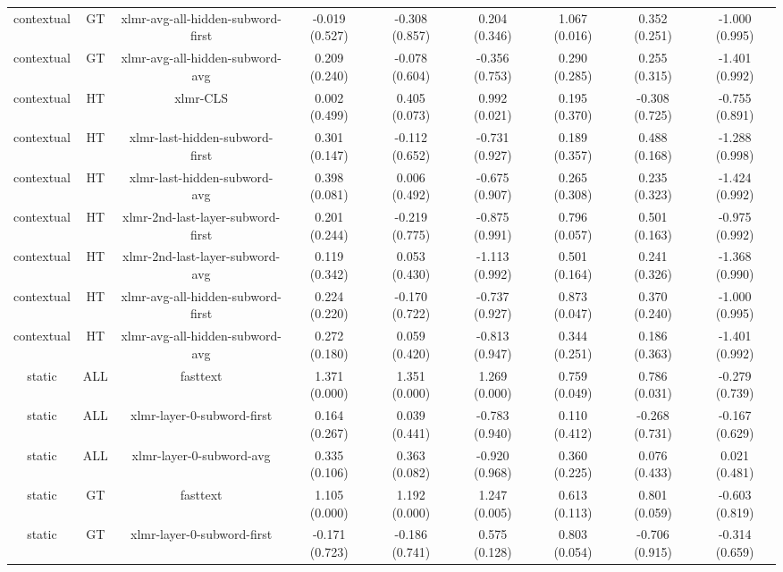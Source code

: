 \begin{sidewaystable}[htb]
\begin{tabular}{@{}ccccccccc@{}}
        contextual & GT & xlmr-avg-all-hidden-subword-first & -0.019 (0.527) & -0.308 (0.857) & 0.204 (0.346) & 1.067 (0.016) & 0.352 (0.251) & -1.000 (0.995) \\
        contextual & GT & xlmr-avg-all-hidden-subword-avg & 0.209 (0.240) & -0.078 (0.604) & -0.356 (0.753) & 0.290 (0.285) & 0.255 (0.315) & -1.401 (0.992) \\
        contextual & HT & xlmr-CLS & 0.002 (0.499) & 0.405 (0.073) & 0.992 (0.021) & 0.195 (0.370) & -0.308 (0.725) & -0.755 (0.891) \\
        contextual & HT & xlmr-last-hidden-subword-first & 0.301 (0.147) & -0.112 (0.652) & -0.731 (0.927) & 0.189 (0.357) & 0.488 (0.168) & -1.288 (0.998) \\
        contextual & HT & xlmr-last-hidden-subword-avg & 0.398 (0.081) & 0.006 (0.492) & -0.675 (0.907) & 0.265 (0.308) & 0.235 (0.323) & -1.424 (0.992) \\
        contextual & HT & xlmr-2nd-last-layer-subword-first & 0.201 (0.244) & -0.219 (0.775) & -0.875 (0.991) & 0.796 (0.057) & 0.501 (0.163) & -0.975 (0.992) \\
        contextual & HT & xlmr-2nd-last-layer-subword-avg & 0.119 (0.342) & 0.053 (0.430) & -1.113 (0.992) & 0.501 (0.164) & 0.241 (0.326) & -1.368 (0.990) \\
        contextual & HT & xlmr-avg-all-hidden-subword-first & 0.224 (0.220) & -0.170 (0.722) & -0.737 (0.927) & 0.873 (0.047) & 0.370 (0.240) & -1.000 (0.995) \\
        contextual & HT & xlmr-avg-all-hidden-subword-avg & 0.272 (0.180) & 0.059 (0.420) & -0.813 (0.947) & 0.344 (0.251) & 0.186 (0.363) & -1.401 (0.992) \\
        static & ALL & fasttext & 1.371 (0.000) & 1.351 (0.000) & 1.269 (0.000) & 0.759 (0.049) & 0.786 (0.031) & -0.279 (0.739) \\
        static & ALL & xlmr-layer-0-subword-first & 0.164 (0.267) & 0.039 (0.441) & -0.783 (0.940) & 0.110 (0.412) & -0.268 (0.731) & -0.167 (0.629) \\
        static & ALL & xlmr-layer-0-subword-avg & 0.335 (0.106) & 0.363 (0.082) & -0.920 (0.968) & 0.360 (0.225) & 0.076 (0.433) & 0.021 (0.481) \\
        static & GT & fasttext & 1.105 (0.000) & 1.192 (0.000) & 1.247 (0.005) & 0.613 (0.113) & 0.801 (0.059) & -0.603 (0.819) \\
        static & GT & xlmr-layer-0-subword-first & -0.171 (0.723) & -0.186 (0.741) & 0.575 (0.128) & 0.803 (0.054) & -0.706 (0.915) & -0.314 (0.659) \\

\end{tabular}
\end{sidewaystable}
